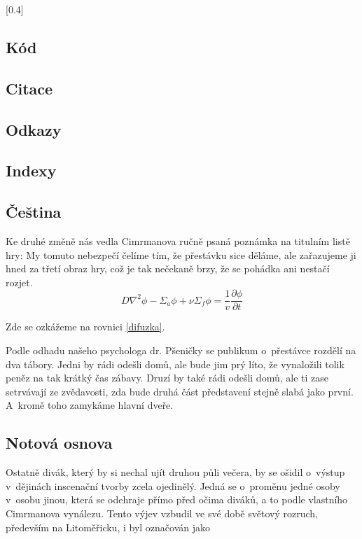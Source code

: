 \documentclass{cygclanek}
\begin{document}
[0.4]



\subsection{Kód}

\subsection{Citace}

\subsection{Odkazy}

\subsection{Indexy}

\subsection{Čeština}











Ke druhé změně \cite{trace_parcs} nás vedla Cimrmanova ručně psaná poznámka na titulním listě hry:
 My tomuto nebezpečí čelíme tím, že
přestávku sice děláme, ale zařazujeme ji hned za třetí obraz hry, což je tak
nečekaně brzy, že se pohádka ani nestačí rozjet. 
\begin{equation}
  D\nabla^2\phi - \Sigma_a\phi + \nu\Sigma_f\phi = \frac{1}{v}\frac{\partial
  \phi}{\partial t}
  \label{difuzka}
\end{equation}

Zde se ozkážeme na rovnici \eqref{difuzka}. 

Podle odhadu našeho psychologa
dr. Pšeničky se publikum o~přestávce rozdělí na dva tábory. Jedni by rádi
odešli domů, ale bude jim prý líto, že vynaložili tolik peněz na tak krátký čas
zábavy. Druzí by také rádi odešli domů, ale ti zase setrvávají ze zvědavosti,
zda bude druhá část představení stejně slabá jako první. A~kromě toho zamykáme
hlavní dveře.


\subsection{Notová osnova}
Ostatně divák, který by si nechal ujít druhou půli večera, by se ošidil
o~výstup v~dějinách inscenační tvorby zcela ojedinělý. Jedná se o~proměnu jedné
osoby v~osobu jinou, která se odehraje přímo před očima diváků, a to podle
vlastního Cimrmanova vynálezu. Tento výjev vzbudil ve své době světový rozruch,
především na Litoměřicku, i byl označován jako 
\end{document}
